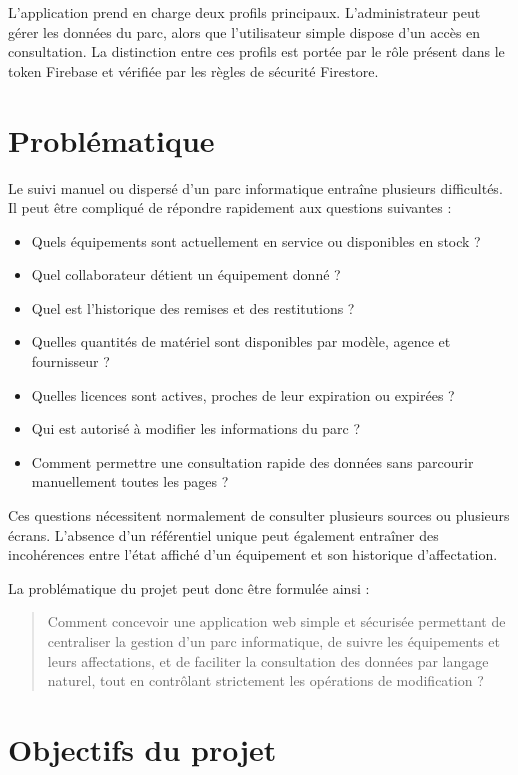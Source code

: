 \documentclass{rapportENSIAS}
\begin{document}
L’application prend en charge deux profils principaux. L’administrateur peut gérer les données du parc, alors que l’utilisateur simple dispose d’un accès en consultation. La distinction entre ces profils est portée par le rôle présent dans le token Firebase et vérifiée par les règles de sécurité Firestore.

\section{Problématique}

Le suivi manuel ou dispersé d’un parc informatique entraîne plusieurs difficultés. Il peut être compliqué de répondre rapidement aux questions suivantes :

\begin{itemize}
\item Quels équipements sont actuellement en service ou disponibles en stock ?
\item Quel collaborateur détient un équipement donné ?
\item Quel est l’historique des remises et des restitutions ?
\item Quelles quantités de matériel sont disponibles par modèle, agence et fournisseur ?
\item Quelles licences sont actives, proches de leur expiration ou expirées ?
\item Qui est autorisé à modifier les informations du parc ?
\item Comment permettre une consultation rapide des données sans parcourir manuellement toutes les pages ?
\end{itemize}

Ces questions nécessitent normalement de consulter plusieurs sources ou plusieurs écrans. L’absence d’un référentiel unique peut également entraîner des incohérences entre l’état affiché d’un équipement et son historique d’affectation.

La problématique du projet peut donc être formulée ainsi :

\begin{quote}
Comment concevoir une application web simple et sécurisée permettant de centraliser la gestion d’un parc informatique, de suivre les équipements et leurs affectations, et de faciliter la consultation des données par langage naturel, tout en contrôlant strictement les opérations de modification ?
\end{quote}

\section{Objectifs du projet}
\end{document}
